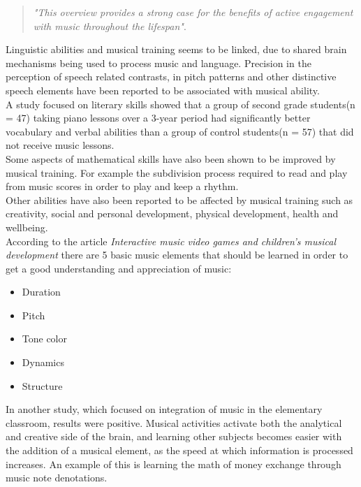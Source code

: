 \begin{quote}
	\textit{"This overview provides a strong case for the benefits of active engagement with music throughout the lifespan"}\cite{powerOfMusic}\label{quote:powerOfMusic}.\\
\end{quote}

Linguistic abilities and musical training seems to be linked, due to shared brain mechanisms being used to process music and language. Precision in the perception of speech related contrasts, in pitch patterns and other distinctive speech elements have been reported to be associated with musical ability\cite{languageSkills}.\\

A study focused on literary skills showed that a group of second grade students(n = 47) taking piano lessons over a 3-year period had significantly better vocabulary and verbal abilities than a group of control students(n = 57) that did not receive music lessons\cite{vocabularySkills}.\\

Some aspects of mathematical skills have also been shown to be improved by musical training. For example the subdivision process required to read and play from music scores in order to play and keep a rhythm\cite{powerOfMusic}.\\

Other abilities have also been reported to be affected by musical training such as creativity, social and personal development, physical development, health and wellbeing\cite{powerOfMusic}.\\

According to the article \textit{Interactive music video games and children's musical development} there are 5 basic music elements that should be learned in order to get a good understanding and appreciation of music\cite[p.~99]{interactiveMusicVideoGames}:
\begin{itemize}\label{list:basicMusic}
	\item Duration
	\item Pitch
	\item Tone color
	\item Dynamics
	\item Structure\\
\end{itemize}

In another study, which focused on integration of music in the elementary classroom, results were positive. Musical activities activate both the analytical and creative side of the brain, and learning other subjects becomes easier with the addition of a musical element, as the speed at which information is processed increases. An example of this is learning the math of money exchange through music note denotations\cite{musicIntegration}.\\

